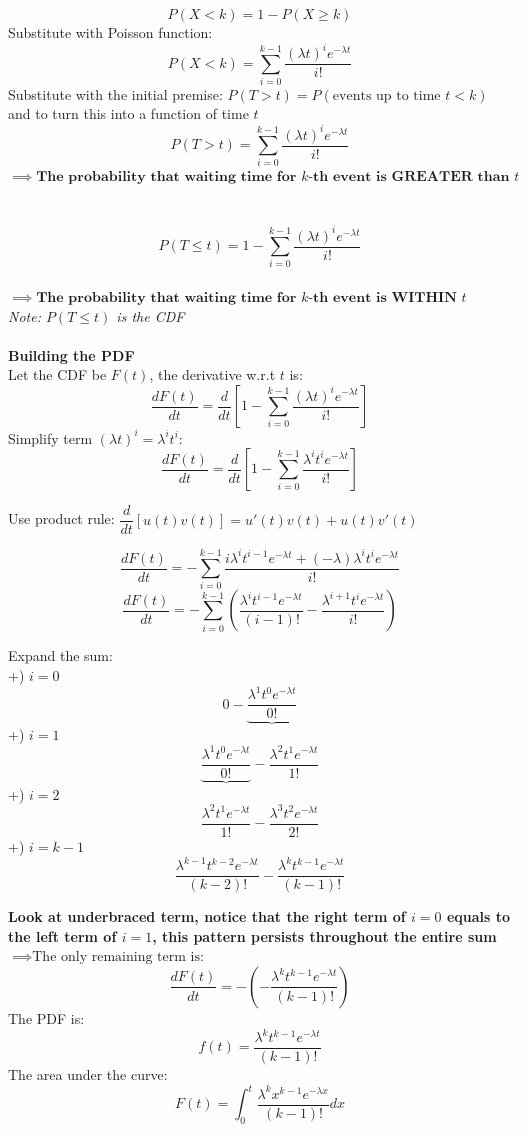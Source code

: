 \documentclass{article}
\begin{document}
$$P(X<k)= 1 - P(X\geq k)$$
Substitute with Poisson function: \\
$$P(X < k) = \sum_{i=0}^{k-1} \dfrac{(\lambda t)^i e^{-\lambda t}}{i!}$$
Substitute with the initial premise: $P(T>t) = P(\text{events up to time } t<k)$ \\ and to turn this into a function of time $t$ \\
$$P(T>t) = \sum_{i=0}^{k-1} \dfrac{(\lambda t)^i e^{-\lambda t}}{i!}$$
$\implies \textbf{The probability that waiting time for $k$-th event is GREATER than $t$}$ \\ \\
 \\
$$P(T \leq t) = 1 - \sum_{i=0}^{k-1} \dfrac{(\lambda t)^i e^{-\lambda t}}{i!}$$ \\
$\implies \textbf{The probability that waiting time for $k$-th event is WITHIN $t$} $ \\
\textit{Note: $P(T \leq t)$ is the CDF} \\ \\
\textbf{Building the PDF} \\
Let the CDF be $F(t)$, the derivative w.r.t $t$ is:
$$\dfrac{dF(t)}{dt} =\dfrac{d}{dt} \left[1- \sum_{i=0}^{k-1} \dfrac{(\lambda t)^i e^{-\lambda t}}{i!}\right]$$
Simplify term $(\lambda t)^i = \lambda^i t^i$:  \\
$$\dfrac{dF(t)}{dt} =\dfrac{d}{dt} \left[1- \sum_{i=0}^{k-1} \dfrac{\lambda^i t^i e^{-\lambda t}}{i!}\right]$$

Use product rule: $\dfrac{d}{dt}[u(t)v(t)] = u'(t)v(t) + u(t)v'(t)$

$$\dfrac{dF(t)}{dt} =- \sum_{i=0}^{k-1} \dfrac{i\lambda^i t^{i-1} e^{-\lambda t} + (-\lambda)\lambda^i t^i e^{-\lambda t}}{i!}$$
$$\dfrac{dF(t)}{dt} =- \sum_{i=0}^{k-1} \left( \dfrac{\lambda^i t^{i-1} e^{-\lambda t}}{(i-1)!} - \dfrac{\lambda^{i+1} t^i e^{-\lambda t}}{i!} \right)$$

\newpage

Expand the sum: \\
+) $i=0$ 
$$0 - \underbrace{\dfrac{\lambda^1 t^0 e^{-\lambda t}}{0!}} $$
+) $i=1$ 
$$\underbrace{ \dfrac{\lambda^1 t^0 e^{-\lambda t}}{0!}} - \dfrac{\lambda^2 t^1 e^{-\lambda t}}{1!}$$
+) $i=2$ 
$$\dfrac{\lambda^2 t^1 e^{-\lambda t}}{1!} - \dfrac{\lambda^3 t^2 e^{-\lambda t}}{2!}$$
+) $i=k-1$
$$\dfrac{\lambda^{k-1} t^{k-2} e^{-\lambda t}}{(k-2)!} - \dfrac{\lambda^k t^{k-1} e^{-\lambda t}}{(k-1)!}$$

\textbf{Look at underbraced term, notice that the right term of $i=0$ equals to the left term of $i = 1$, this pattern persists throughout the entire sum} \\
$\implies \text{The only remaining term is:}$
$$\dfrac{dF(t)}{dt} = -\left(- \dfrac{\lambda^k t^{k-1} e^{-\lambda t}}{(k-1)!} \right)$$
The PDF is:
$$f(t) =  \dfrac{\lambda^k t^{k-1} e^{-\lambda t}}{(k-1)!} $$
The area under the curve:
$$F(t) = \int_0^t \dfrac{\lambda^k x^{k-1} e^{-\lambda x}}{(k-1)!} dx$$
\end{document}
